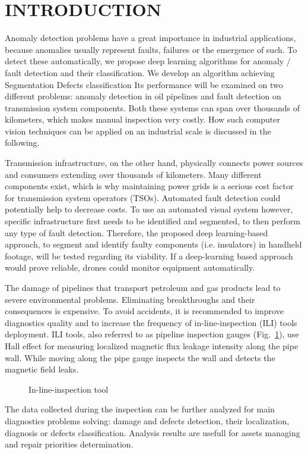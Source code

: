 \section{INTRODUCTION}
\label{INTRODUCTION}

Anomaly detection problems have a great importance in industrial applications, because anomalies usually represent faults, failures or the emergence of such. To detect these automatically, we propose deep learning algorithms for anomaly / fault detection and their classification. We develop an algorithm achieving Segmentation Defects classification Its performance will be examined on two different problems: anomaly detection in oil pipelines and fault detection on transmission system components. Both these systems can span over thousands of kilometers, which makes manual inspection very costly. How such computer vision techniques can be applied on an industrial scale is discussed in the following.

Transmission infrastructure, on the other hand, physically connects power sources and consumers extending over thousands of kilometers. Many different components exist, which is why maintaining power grids is a serious cost factor for transmission system operators (TSOs). Automated fault detection could potentially help to decrease costs. To use an automated visual system however, specific infrastructure first needs to be identified and segmented, to then perform any type of fault detection. Therefore, the proposed deep learning-based approach, to segment and identify faulty components (i.e. insulators) in handheld footage, will be tested regarding its viability. If a deep-learning based approach would prove reliable, drones could monitor equipment automatically.

The damage of pipelines that transport petroleum and gas products lead to severe environmental problems. Eliminating breakthroughs and their consequences is expensive. To avoid accidents, it is recommended to improve diagnostics quality and to increase the frequency of in-line-inspection (ILI) tools deployment. ILI tools, also referred to as pipeline inspection gauges (Fig.~\ref{ris:ili}), use Hall effect for measuring localized magnetic flux leakage intensity along the pipe wall. While moving along the pipe gauge inspects the wall and detects the magnetic field leaks.
\begin{figure}[ht]
	\caption{In-line-inspection tool}
	\label{ris:ili}
\end{figure}
The data collected during the inspection can be further analyzed for main diagnostics problems solving: damage and defects detection, their localization, diagnosis or defects classification.
Analysis results are usefull for assets managing and repair priorities determination.
